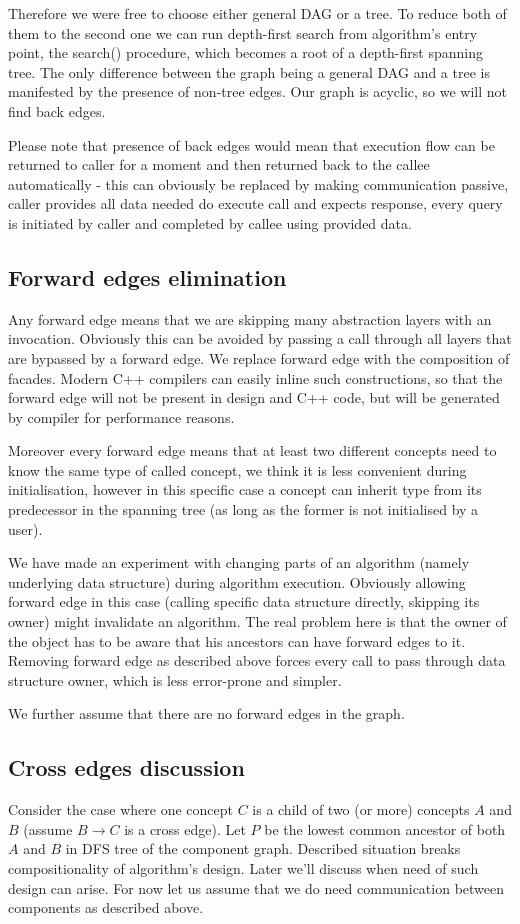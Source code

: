 Therefore we were free to choose either general DAG or a tree. To reduce both
of them to the second one we can run depth-first search from algorithm's entry
point, the search() procedure, which becomes a root of a depth-first spanning
tree. The only difference between the graph being a general DAG and a tree is
manifested by the presence of non-tree edges. Our graph is acyclic, so we will
not find back edges.

Please note that presence of back edges would mean that execution flow can be
returned to caller for a moment and then returned back to the callee
automatically - this can obviously be replaced by making communication
passive, caller provides all data needed do execute call and expects
response, every query is initiated by caller and completed by callee using
provided data.

\subsection{Forward edges elimination}
Any forward edge means that we are skipping many abstraction layers with an
invocation. Obviously this can be avoided by passing a call through all layers
that are bypassed by a forward edge. We replace forward edge with the composition
of facades. Modern C++ compilers can easily inline such constructions, so that
the forward edge will not be present in design and C++ code, but will be
generated by compiler for performance reasons.

Moreover every forward edge means that at least two different concepts need to
know the same type of called concept, we think it is less convenient during
initialisation, however in this specific case a concept can inherit type from
its predecessor in the spanning tree (as long as the former is not initialised
by a user).

We have made an experiment with changing parts of an algorithm (namely
underlying data structure) during algorithm execution. Obviously allowing
forward edge in this case (calling specific data structure directly, skipping
its owner) might invalidate an algorithm. The real problem here is that the owner
of the object has to be aware that his ancestors can have forward edges to it.
Removing forward edge as described above forces every call to pass through data structure owner,
which is less error-prone and simpler.

We further assume that there are no forward edges in the graph.

\subsection{Cross edges discussion}
Consider the case where one concept $C$ is a child of two (or more) concepts
$A$ and $B$ (assume $B \to C$ is a cross edge). Let $P$ be the lowest common
ancestor of both $A$ and $B$ in DFS tree of the component graph.
Described situation breaks compositionality of algorithm's design. Later
we'll discuss when need of such design can arise. For now let us assume that we do
need communication between components as described above.

